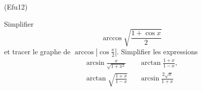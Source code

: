 \begin{tiny}(Efu12)\end{tiny} Simplifier
\begin{displaymath}
 \arccos \sqrt{\frac{1+\cos x}{2}}
\end{displaymath}
et tracer le graphe de $\arccos|\cos \frac{x}{2}|$. Simplifier les expressions
\begin{align*}
\arcsin \frac{x}{\sqrt{1+x^{2}}} & & \arctan \frac{1+x}{1-x},\\
\arctan \sqrt{\frac{1+x}{1-x}} & & \arcsin \frac{2\sqrt{x}}{1+x}
\end{align*}
